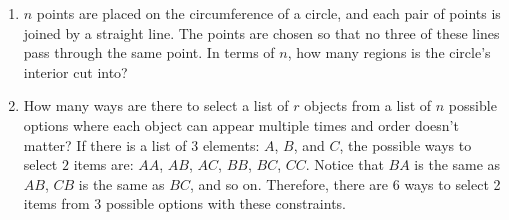 \documentclass{article}
\begin{document}
\begin{enumerate}
    \item
    $n$ points are placed on the circumference of a circle, and each pair of points is joined by a straight line. The points are chosen so that no three of these lines pass through the same point. In terms of $n$, how many regions is the circle's interior cut into?
    
    \item
    How many ways are there to select a list of $r$ objects from a list of $n$ possible options where each object can appear multiple times and order doesn't matter? If there is a list of 3 elements: $A$, $B$, and $C$, the possible ways to select $2$ items are: $AA$, $AB$, $AC$, $BB$, $BC$, $CC$. Notice that $BA$ is the same as $AB$, $CB$ is the same as $BC$, and so on. Therefore, there are 6 ways to select 2 items from 3 possible options with these constraints.

    
    
    
    
    
    
\end{enumerate}
\end{document}
